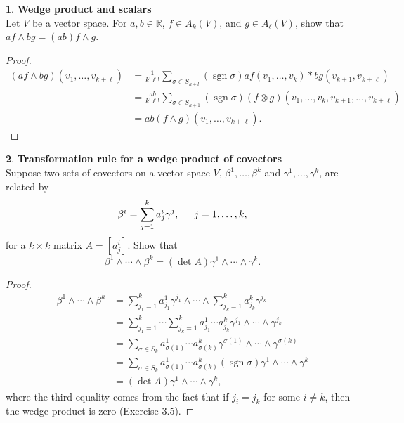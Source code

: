 \documentclass[12pt]{article}
\DeclareMathOperator{\sgn}{sgn}
\theoremstyle{definition}
\newtheorem{ex}{}[section]
\begin{document}
\begin{ex}
	\textbf{Wedge product and scalars} \\
	Let $V$ be a vector space.
	For $a, b \in \mathbb{R}$, $f \in A_k(V)$, and $g \in A_\ell(V)$, show that $af \wedge bg = (ab)f \wedge g$.
\end{ex}
\begin{proof}
	\begin{align*}
		(af \wedge bg)(v_1, \dots, v_{k + \ell}) & = \frac{1}{k!\ell!}\sum_{\sigma \in S_{k + l}} (\sgn \sigma) af(v_1, \dots, v_k) * bg(v_{k + 1}, v_{k + \ell})                \\
		                                         & = \frac{ab}{k!\ell!} \sum_{\sigma \in S_{k + 1}} (\sgn \sigma) (f \otimes g)(v_1, \dots, v_k, v_{k + 1}, \dots, v_{k + \ell}) \\
		                                         & = ab (f \wedge g)(v_1, \dots, v_{k + \ell}).
	\end{align*}
\end{proof}

\begin{ex}
	\textbf{Transformation rule for a wedge product of covectors} \\
	Suppose two sets of covectors on a vector space $V$, $\beta^1, \dots, \beta^k$ and $\gamma^1, \dots, \gamma^k$, are related by \begin{equation*}
		\beta^i = \sum_{j = 1}^k a^i_j \gamma^j, \hspace{1.5em} j = 1, \dots, k,
	\end{equation*}
	for a $k \times k$ matrix $A = [a^i_j]$.
	Show that \begin{equation*}
		\beta^1 \wedge \cdots \wedge \beta^k = (\det A) \gamma^1 \wedge \cdots \wedge \gamma^k.
	\end{equation*}
\end{ex}
\begin{proof}
	\begin{align*}
		\beta^1 \wedge \cdots \wedge \beta^k & = \sum_{j_1 = 1}^k a^1_{j_1}\gamma^{j_1} \wedge \cdots \wedge \sum_{j_k = 1}^k a^k_{j_k}\gamma^{j_k}                   \\
		                                     & = \sum_{j_1 = 1}^k \cdots \sum_{j_k = 1}^k a^1_{j_1} \cdots a^k_{j_k} \gamma^{j_1} \wedge \cdots \wedge \gamma^{j_k}   \\
		                                     & = \sum_{\sigma \in S_k} a^1_{\sigma(1)} \cdots a^k_{\sigma(k)} \gamma^{\sigma(1)}\wedge\cdots\wedge \gamma^{\sigma(k)} \\
		                                     & = \sum_{\sigma \in S_k} a^1_{\sigma(1)} \cdots a^k_{\sigma(k)} (\sgn \sigma)\gamma^1\wedge\cdots\wedge \gamma^k        \\
		                                     & = (\det A) \gamma^1 \wedge \cdots \wedge \gamma^k,
	\end{align*}
	where the third equality comes from the fact that if $j_i = j_k$ for some $i \neq k$, then the wedge product is zero (Exercise 3.5).
\end{proof}
\end{document}
